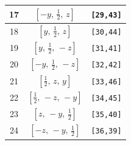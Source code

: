 \documentclass[fleqn,8pt]{jsarticle}
\begin{document}
\begin{longtable}{ccc}
17 & $\left[ - y,\, \frac{1}{2},\, z \right]$ & {\tt [29,43]} \\ \hline
18 & $\left[ y,\, \frac{1}{2},\, z \right]$ & {\tt [30,44]} \\ \hline
19 & $\left[ y,\, \frac{1}{2},\, - z \right]$ & {\tt [31,41]} \\ \hline
20 & $\left[ - y,\, \frac{1}{2},\, - z \right]$ & {\tt [32,42]} \\ \hline
21 & $\left[ \frac{1}{2},\, z,\, y \right]$ & {\tt [33,46]} \\ \hline
22 & $\left[ \frac{1}{2},\, - z,\, - y \right]$ & {\tt [34,45]} \\ \hline
23 & $\left[ z,\, - y,\, \frac{1}{2} \right]$ & {\tt [35,40]} \\ \hline
24 & $\left[ - z,\, - y,\, \frac{1}{2} \right]$ & {\tt [36,39]} \\
\end{longtable}
\renewcommand{\arraystretch}{1.2}
\end{document}
